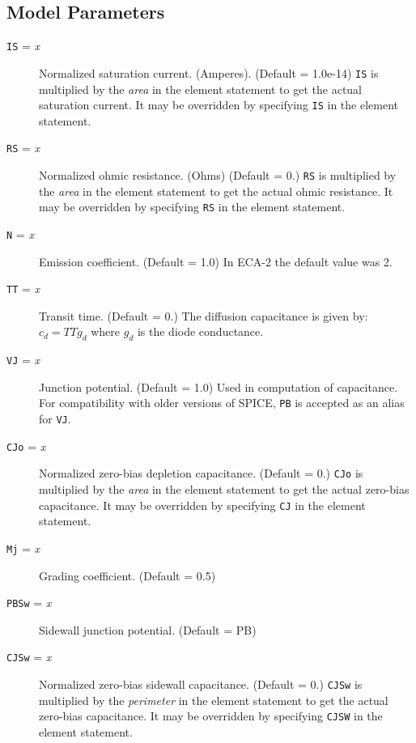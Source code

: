 \subsection{Model Parameters}

\begin{description}
  
\item[{\tt IS} = {\it x}] Normalized saturation current. (Amperes).
  (Default = 1.0e-14) {\tt IS} is multiplied by the {\it area} in the
  element statement to get the actual saturation current.  It may be
  overridden by specifying {\tt IS} in the element statement.
  
\item[{\tt RS} = {\it x}] Normalized ohmic resistance. (Ohms) (Default
  = 0.)  {\tt RS} is multiplied by the {\it area} in the element
  statement to get the actual ohmic resistance.  It may be overridden
  by specifying {\tt RS} in the element statement.
  
\item[{\tt N} = {\it x}] Emission coefficient. (Default = 1.0) In
  ECA-2 the default value was 2.
  
\item[{\tt TT} = {\it x}] Transit time. (Default = 0.)  The diffusion
  capacitance is given by: $c_d = TT g_d$ where $g_d$ is the diode
  conductance.
  
\item[{\tt VJ} = {\it x}] Junction potential.  (Default = 1.0) Used in
  computation of capacitance.  For compatibility with older versions
  of SPICE, {\tt PB} is accepted as an alias for {\tt VJ}.

\item[{\tt CJo} = {\it x}] Normalized zero-bias depletion capacitance.
  (Default = 0.)  {\tt CJo} is multiplied by the {\it area} in the
  element statement to get the actual zero-bias capacitance.  It may
  be overridden by specifying {\tt CJ} in the element statement.
  
\item[{\tt Mj} = {\it x}] Grading coefficient.  (Default = 0.5)
  
\item[{\tt PBSw} = {\it x}] Sidewall junction potential.  (Default =
  PB)
  
\item[{\tt CJSw} = {\it x}] Normalized zero-bias sidewall capacitance.
  (Default = 0.)  {\tt CJSw} is multiplied by the {\it perimeter} in
  the element statement to get the actual zero-bias capacitance.  It
  may be overridden by specifying {\tt CJSW} in the element statement.
  

\end{description}

